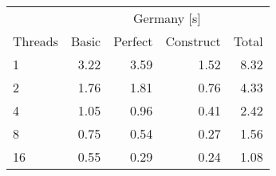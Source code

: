 \begin{tabular}{lrrrr}
\toprule
& \multicolumn{4}{c}{Germany [s]} \\ \cmidrule(lr){2-5}
Threads & Basic & Perfect & Construct &  Total \\
\midrule
1           &   3.22 &     3.59 &       1.52 &   8.32 \\
2           &   1.76 &     1.81 &       0.76 &   4.33 \\
4           &   1.05 &     0.96 &       0.41 &   2.42 \\
8           &   0.75 &     0.54 &       0.27 &   1.56 \\
16          &   0.55 &     0.29 &       0.24 &   1.08 \\
\bottomrule
\end{tabular}

